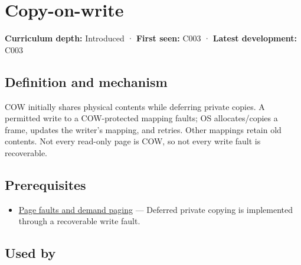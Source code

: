 \hypertarget{appendix-7a06e5baac04}{}\label{referencestart:appendix-7a06e5baac04}
\section{Copy-on-write}\label{appendix-7a06e5baac04-copy-on-write}

\hypertarget{appendix-7a06e5baac04-copy-on-write}{}

\textbf{Curriculum depth:} Introduced · \textbf{First seen:} C003 · \textbf{Latest development:} C003

\begin{allmightroledefinition}

\subsection{Definition and mechanism}\label{appendix-7a06e5baac04-definition-and-mechanism}

\hypertarget{appendix-7a06e5baac04-definition-and-mechanism}{}

COW initially shares physical contents while deferring private copies. A permitted write to a COW-protected mapping faults; OS allocates/copies a frame, updates the writer's mapping, and retries. Other mappings retain old contents. Not every read-only page is COW, so not every write fault is recoverable.

\end{allmightroledefinition}

\subsection{Prerequisites}\label{appendix-7a06e5baac04-prerequisites}

\hypertarget{appendix-7a06e5baac04-prerequisites}{}

\begin{itemize}
\tightlist
\item
  \hyperref[appendix-cc0909a7ef14]{Page faults and demand paging} --- Deferred private copying is implemented through a recoverable write fault.
\end{itemize}

\subsection{Used by}\label{appendix-7a06e5baac04-used-by}

\hypertarget{appendix-7a06e5baac04-used-by}{}

